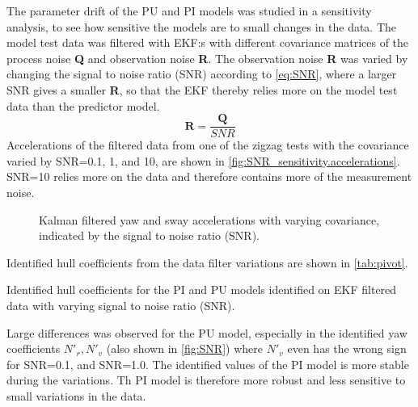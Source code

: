 The parameter drift of the PU and PI models was studied in a sensitivity analysis, to see how sensitive the models are to small changes in the data.
The model test data was filtered with EKF:s with different covariance matrices of the process noise \textbf{Q} and observation noise \textbf{R}. The observation noise \textbf{R} was varied by changing the signal to noise ratio (SNR) according to \autoref{eq:SNR}, where a larger SNR gives a smaller \textbf{R}, so that the EKF thereby relies more on the model test data than the predictor model.
\begin{equation}
    \label{eq:SNR}
    \mathbf{R} = \frac{\mathbf{Q}}{SNR}
\end{equation}
Accelerations of the filtered data from one of the zigzag tests with the covariance varied by SNR=0.1, 1, and 10, are shown in \autoref{fig:SNR_sensitivity.accelerations}. SNR=10 relies more on the data and therefore contains more of the measurement noise.
\begin{figure}[h]
    \begin{center}
        
        \caption{Kalman filtered yaw and sway accelerations with varying covariance, indicated by the signal to noise ratio (SNR).}
        \label{fig:SNR_sensitivity.accelerations}
    \end{center}
\end{figure}
Identified hull coefficients from the data filter variations are shown in \autoref{tab:pivot}.
\begin{table}[h]
    \centering
    \caption{Identified hull coefficients for the PI and PU models identified on EKF filtered data with varying signal to noise ratio (SNR).}
    \label{tab:pivot}
\end{table}
Large differences was observed for the PU model, especially in the identified yaw coefficients ${N}'_r,{N}'_v$ (also shown in \autoref{fig:SNR}) where ${N}'_v$ even has the wrong sign for SNR=0.1, and SNR=1.0. The identified values of the PI model is more stable during the variations. Th PI model is therefore more robust and less sensitive to small variations in the data.
